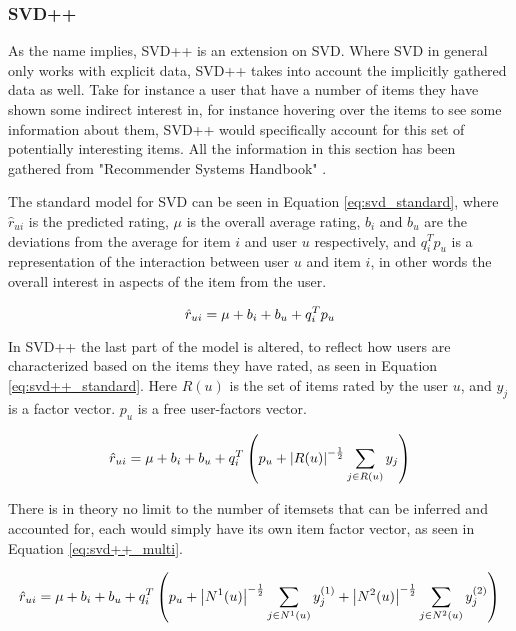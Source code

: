 \subsubsection{SVD++} \label{bg:mf_svd++}
As the name implies, SVD++ is an extension on SVD. Where SVD in general only works with explicit data, SVD++ takes into account the implicitly gathered data as well. Take for instance a user that have a number of items they have shown some indirect interest in, for instance hovering over the items to see some information about them, SVD++ would specifically account for this set of potentially interesting items. All the information in this section has been gathered from "Recommender Systems Handbook" \cite{recsyshandbook}.


 
The standard model for SVD can be seen in Equation \ref{eq:svd_standard}, where $\hat{r}_{ui}$ is the predicted rating, $\mu$ is the overall average rating, $b_{i}$ and $b_{u}$ are the deviations from the average for item $i$ and user $u$ respectively, and $q_{i}^{T}p_{u}$ is a representation of the interaction between user $u$ and item $i$, in other words the overall interest in aspects of the item from the user.

\begin{equation} \label{eq:svd_standard}
\centering
\hat{r}_{ui} = \mu + b_{i} + b_{u} + q_{i}^{T}p_{u}
\end{equation}

In SVD++ the last part of the model is altered, to reflect how users are characterized based on the items they have rated, as seen in Equation \ref{eq:svd++_standard}. Here $R(u)$ is the set of items rated by the user $u$, and $y_{j}$ is a factor vector. $p_{u}$ is a free user-factors vector.

\begin{equation} \label{eq:svd++_standard}
\centering
\hat{r}_{ui} = \mu + b_{i} + b_{u} + q_{i}^{T}\left (p_{u} + \left | R(u) \right |^{-\frac{1}{2}} \sum_{j\in R(u)} y_{j} \right )
\end{equation}

There is in theory no limit to the number of itemsets that can be inferred and accounted for, each would simply have its own item factor vector, as seen in Equation \ref{eq:svd++_multi}.

\begin{equation} \label{eq:svd++_multi}
\centering
\hat{r}_{ui} = \mu + b_{i} + b_{u} + q_{i}^{T}\left (p_{u} + \left | N^{1}(u) \right |^{-\frac{1}{2}} \sum_{j\in N^{1}(u)} y_{j}^{(1)} + \left | N^{2}(u) \right |^{-\frac{1}{2}} \sum_{j\in N^{2}(u)} y_{j}^{(2)} \right )
\end{equation}

